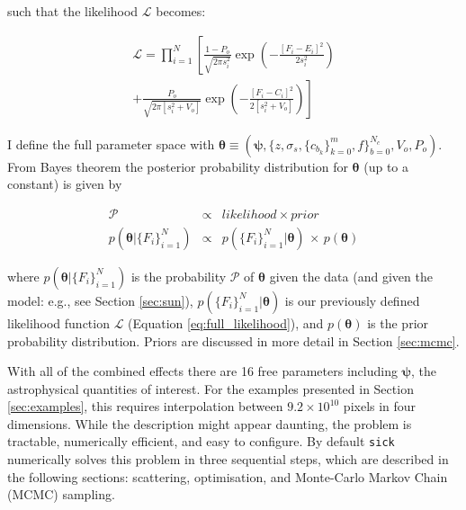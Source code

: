 \documentclass[iop]{emulateapj}
\newcommand{\sick}{\texttt{sick}}
\begin{document}
\noindent{}such that the likelihood $\mathcal{L}$ becomes:

\begin{multline}
\mathcal{L} = \prod_{i=1}^{N} \left[ \frac{1-P_o}{\sqrt{2\pi{}s_{i}^2}}\exp\left(-\frac{[F_i - E_i]^2}{2s_{i}^{2}}\right) \right.\\
\left. + \frac{P_o}{\sqrt{2\pi\left[s_{i}^2 + V_o\right]}}\exp\left(-\frac{[F_i - C_i]^2}{2\left[s_{i}^{2} + V_o\right]}\right)\right]
\label{eq:full_likelihood}
\end{multline}

I define the full parameter space with ${\bm{\theta} \equiv \left(\bm{\psi},\{z,\sigma_s,\{c_{b_k}\}_{k=0}^{m},f\}_{b=0}^{N_{c}},V_o,P_o\right)}$. From Bayes theorem the posterior probability 
distribution for $\bm{\theta}$ (up to a constant) is given by

\begin{eqnarray}
\mathcal{P} & \propto & likelihood \times prior \nonumber \\
p(\bm{\theta}|\{F_i\}_{i=1}^{N}) & \propto & p(\{F_i\}_{i=1}^{N}|\bm{\theta})\,\times\,p(\bm{\theta})
\label{eq:probability}
\end{eqnarray}

\noindent{}where $p(\bm{\theta}|\{F_i\}_{i=1}^{N})$ is the probability $\mathcal{P}$ 
of $\bm{\theta}$ given the data (and given the model: e.g., see Section \ref{sec:sun}), 
$p(\{F_i\}_{i=1}^{N}|\bm{\theta})$ is our previously defined likelihood function 
$\mathcal{L}$ (Equation \ref{eq:full_likelihood}), and $p(\bm{\theta})$ is the prior 
probability distribution. Priors are discussed in more detail in Section \ref{sec:mcmc}. 


With all of the combined effects there are 16 free parameters including $\bm{\psi}$, 
the astrophysical quantities of interest. For the examples presented in Section 
\ref{sec:examples}, this requires interpolation between $9.2 \times 10^{10}$ pixels in four 
dimensions. While the description might appear daunting, the problem is tractable, 
numerically efficient, and easy to configure. By default \sick{} numerically solves 
this problem in three sequential steps, which are described in the following 
sections: scattering, optimisation, and Monte-Carlo Markov Chain (MCMC) sampling.
\end{document}
